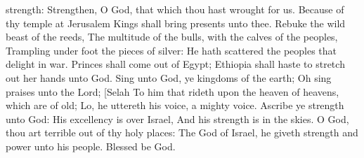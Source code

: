 strength: Strengthen, O God, that which thou hast wrought for us.  Because of thy temple at Jerusalem Kings shall bring presents unto thee.  Rebuke the wild beast of the reeds, The multitude of the bulls, with the calves of the peoples, Trampling under foot the pieces of silver: He hath scattered the peoples that delight in war.  Princes shall come out of Egypt; Ethiopia shall haste to stretch out her hands unto God.  Sing unto God, ye kingdoms of the earth; Oh sing praises unto the Lord; [Selah  To him that rideth upon the heaven of heavens, which are of old; Lo, he uttereth his voice, a mighty voice.  Ascribe ye strength unto God: His excellency is over Israel, And his strength is in the skies.  O God, thou art terrible out of thy holy places: The God of Israel, he giveth strength and power unto his people. Blessed be God. 

